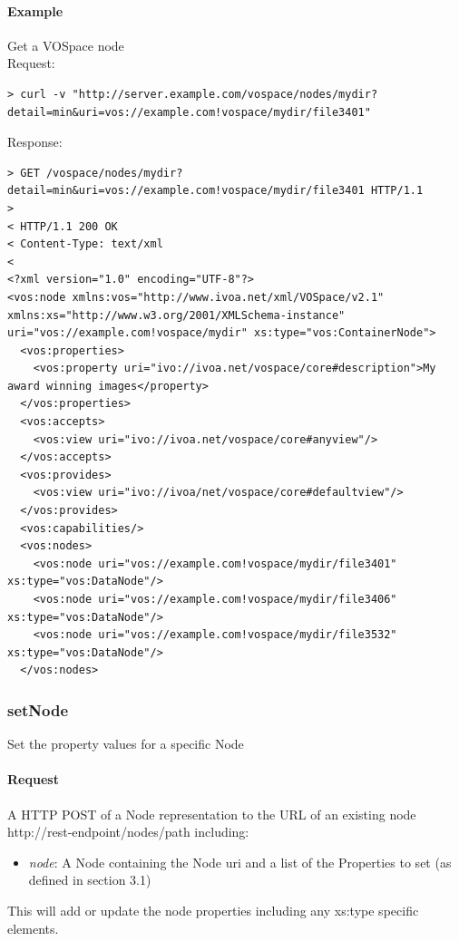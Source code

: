 \documentclass[11pt,a4paper]{ivoa}
\begin{document}
\paragraph{Example}
Get a VOSpace node
\\[5px]
\noindent
Request:
\begin{lstlisting}
> curl -v "http://server.example.com/vospace/nodes/mydir?detail=min&uri=vos://example.com!vospace/mydir/file3401"
\end{lstlisting}
Response:
\begin{lstlisting}
> GET /vospace/nodes/mydir?detail=min&uri=vos://example.com!vospace/mydir/file3401 HTTP/1.1
>
< HTTP/1.1 200 OK
< Content-Type: text/xml
<
<?xml version="1.0" encoding="UTF-8"?>
<vos:node xmlns:vos="http://www.ivoa.net/xml/VOSpace/v2.1" xmlns:xs="http://www.w3.org/2001/XMLSchema-instance" uri="vos://example.com!vospace/mydir" xs:type="vos:ContainerNode">
  <vos:properties>
    <vos:property uri="ivo://ivoa.net/vospace/core#description">My award winning images</property>
  </vos:properties>
  <vos:accepts>
    <vos:view uri="ivo://ivoa.net/vospace/core#anyview"/>
  </vos:accepts>
  <vos:provides>
    <vos:view uri="ivo://ivoa/net/vospace/core#defaultview"/>
  </vos:provides>
  <vos:capabilities/>
  <vos:nodes>
    <vos:node uri="vos://example.com!vospace/mydir/file3401" xs:type="vos:DataNode"/>
    <vos:node uri="vos://example.com!vospace/mydir/file3406" xs:type="vos:DataNode"/>
    <vos:node uri="vos://example.com!vospace/mydir/file3532" xs:type="vos:DataNode"/>
  </vos:nodes>
\end{lstlisting}

\subsubsection{setNode}
\label{subsubsec:setnode}
Set the property values for a specific Node

\paragraph{Request}
A HTTP POST of a Node representation to the URL of an existing node http://rest-endpoint/nodes/path including:
\begin{itemize}
    \item \emph{node}: A Node containing the Node uri and a list of the Properties to set (as defined in section 3.1)
\end{itemize}
This will add or update the node properties including any xs:type specific elements.
\end{document}
